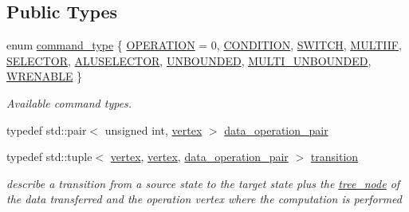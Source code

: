 \subsection*{Public Types}
\begin{DoxyCompactItemize}
\item 
enum \hyperlink{classcommandport__obj_a2aacc9b2d5176f992066e7d499a5322e}{command\+\_\+type} \{ \newline
\hyperlink{classcommandport__obj_a2aacc9b2d5176f992066e7d499a5322ea8bfca134f7e7b3a34850a3b6b2c8c690}{O\+P\+E\+R\+A\+T\+I\+ON} = 0, 
\hyperlink{classcommandport__obj_a2aacc9b2d5176f992066e7d499a5322eae08950e61fe552fe27e7f02c325e95a8}{C\+O\+N\+D\+I\+T\+I\+ON}, 
\hyperlink{classcommandport__obj_a2aacc9b2d5176f992066e7d499a5322eab826a845fd4c73aeb0139b53e2de3947}{S\+W\+I\+T\+CH}, 
\hyperlink{classcommandport__obj_a2aacc9b2d5176f992066e7d499a5322ea620514cd07c5f46f13630020fea6f582}{M\+U\+L\+T\+I\+IF}, 
\newline
\hyperlink{classcommandport__obj_a2aacc9b2d5176f992066e7d499a5322ea7f2ac71980ebff6704ec35a1f492845f}{S\+E\+L\+E\+C\+T\+OR}, 
\hyperlink{classcommandport__obj_a2aacc9b2d5176f992066e7d499a5322ea5b94c296f0bd96a0e7d6cb1e3f9f9acf}{A\+L\+U\+S\+E\+L\+E\+C\+T\+OR}, 
\hyperlink{classcommandport__obj_a2aacc9b2d5176f992066e7d499a5322ea15ab2305310b2ac662b06feadc1c01a3}{U\+N\+B\+O\+U\+N\+D\+ED}, 
\hyperlink{classcommandport__obj_a2aacc9b2d5176f992066e7d499a5322ead0e51b3a389f0d3fad95130875aa0ea5}{M\+U\+L\+T\+I\+\_\+\+U\+N\+B\+O\+U\+N\+D\+ED}, 
\newline
\hyperlink{classcommandport__obj_a2aacc9b2d5176f992066e7d499a5322ea87b1b3fe10417a789ca1b9c82a4a7afb}{W\+R\+E\+N\+A\+B\+LE}
 \}\begin{DoxyCompactList}\small\item\em Available command types. \end{DoxyCompactList}
\item 
typedef std\+::pair$<$ unsigned int, \hyperlink{graph_8hpp_abefdcf0544e601805af44eca032cca14}{vertex} $>$ \hyperlink{classcommandport__obj_a469b1d6eb72e39848c242838513d742b}{data\+\_\+operation\+\_\+pair}
\item 
typedef std\+::tuple$<$ \hyperlink{graph_8hpp_abefdcf0544e601805af44eca032cca14}{vertex}, \hyperlink{graph_8hpp_abefdcf0544e601805af44eca032cca14}{vertex}, \hyperlink{classcommandport__obj_a469b1d6eb72e39848c242838513d742b}{data\+\_\+operation\+\_\+pair} $>$ \hyperlink{classcommandport__obj_aae52b929cff6d84d461b91d88baa3203}{transition}
\begin{DoxyCompactList}\small\item\em describe a transition from a source state to the target state plus the \hyperlink{classtree__node}{tree\+\_\+node} of the data transferred and the operation vertex where the computation is performed \end{DoxyCompactList}\end{DoxyCompactItemize}
